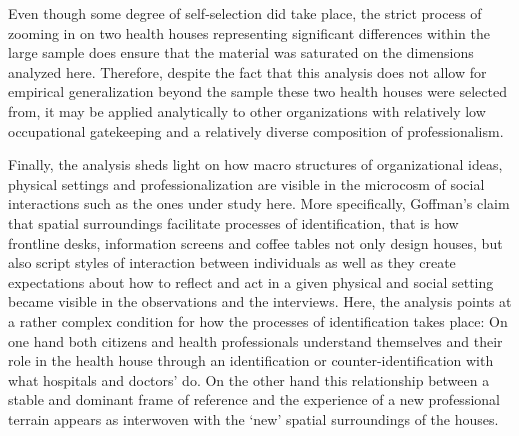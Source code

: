\par
Even though some degree of self-selection did take place, the strict process of zooming in on two health houses representing significant differences within the large sample does ensure that the material was saturated on the dimensions analyzed here. Therefore, despite the fact that this analysis does not allow for empirical generalization beyond the sample these two health houses were selected from, it may be applied analytically to other organizations with relatively low occupational gatekeeping and a relatively diverse composition of professionalism. \par
Finally, the analysis sheds light on how macro structures of organizational ideas, physical settings and professionalization are visible in the microcosm of social interactions such as the ones under study here. More specifically, Goffman’s claim that spatial surroundings facilitate processes of identification, that is how frontline desks, information screens and coffee tables not only design houses, but also script styles of interaction between individuals as well as they create expectations about how to reflect and act in a given physical and social setting became visible in the observations and the interviews. Here, the analysis points at a rather complex condition for how the processes of identification takes place: On one hand both citizens and health professionals understand themselves and their role in the health house through an identification or counter-identification with what hospitals and doctors’ do. On the other hand this relationship between a stable and dominant frame of reference and the experience of a new professional terrain appears as interwoven with the ‘new’ spatial surroundings of the houses.